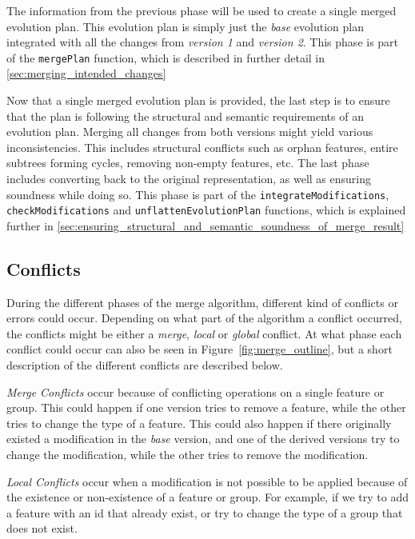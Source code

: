 \documentclass[a4paper,english]{ifimaster}
\begin{document}
The information from the previous phase will be used to create a single merged evolution plan. This evolution plan is simply just the \textit{base} evolution plan integrated with all the changes from \textit{version 1} and \textit{version 2}. This phase is part of the \texttt{mergePlan} function, which is described in further detail in \vref{sec:merging_intended_changes}

Now that a single merged evolution plan is provided, the last step is to ensure that the plan is following the structural and semantic requirements of an evolution plan. Merging all changes from both versions might yield various inconsistencies. This includes structural conflicts such as orphan features, entire subtrees forming cycles, removing non-empty features, etc. The last phase includes converting back to the original representation, as well as ensuring soundness while doing so. This phase is part of the \texttt{integrateModifications}, \texttt{checkModifications} and \texttt{unflattenEvolutionPlan} functions, which is explained further in \vref{sec:ensuring_structural_and_semantic_soundness_of_merge_result}

\subsection{Conflicts}%
\label{sub:conflicts}

During the different phases of the merge algorithm, different kind of conflicts or errors could occur. Depending on what part of the algorithm a conflict occurred, the conflicts might be either a \textit{merge}, \textit{local} or \textit{global} conflict. At what phase each conflict could occur can also be seen in Figure~\vref{fig:merge_outline}, but a short description of the different conflicts are described below. 

\textit{Merge Conflicts} occur because of conflicting operations on a single feature or group. This could happen if one version tries to remove a feature, while the other tries to change the type of a feature. This could also happen if there originally existed a modification in the \textit{base} version, and one of the derived versions try to change the modification, while the other tries to remove the modification.

\textit{Local Conflicts} occur when a modification is not possible to be applied because of the existence or non-existence of a feature or group. For example, if we try to add a feature with an id that already exist, or try to change the type of a group that does not exist.
\end{document}
